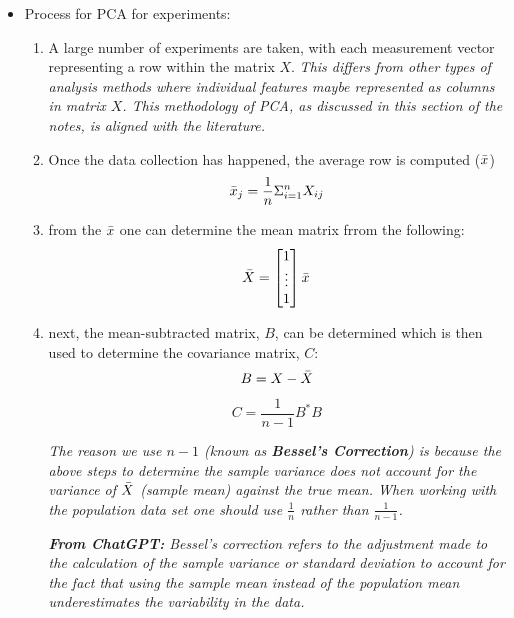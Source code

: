 \documentclass[11.5pt,a4paper]{article}
\begin{document}
\begin{itemize}
    \item Process for PCA for experiments:
    \begin{enumerate}
        \item A large number of experiments are taken, with each measurement vector representing a row within the matrix $X$. \textit{This differs from other types of analysis methods where individual features maybe represented as columns in matrix $X$. This methodology of PCA, as discussed in this section of the notes, is aligned with the literature.}
        \item Once the data collection has happened, the average row is computed ($\Bar{x}$)
        \begin{equation*}
            \Bar{x}_j = \frac{1}{n}\Sigma_{i=1}^n X_{ij}
        \end{equation*}
        \item from the $\Bar{x}$ one can determine the mean matrix frrom the following:
        \begin{equation*}
            \Bar{X} = \begin{bmatrix}
                1 \\
                \vdots \\
                1
            \end{bmatrix} \Bar{x}
        \end{equation*}
        \item next, the mean-subtracted matrix, $B$, can be determined which is then used to determine the covariance matrix, $C$:
        \begin{equation*}
            B = X - \Bar{X}
        \end{equation*}
        \begin{equation*}
            C = \frac{1}{n-1}B^*B
        \end{equation*}

        \textit{The reason we use $n-1$ (known as \textbf{Bessel's Correction}) is because the above steps to determine the sample variance does not account for the variance of $\Bar{X}$ (sample mean) against the true mean. When working with the population data set one should use $\frac{1}{n}$ rather than $\frac{1}{n-1}$.}

        \textit{\textbf{From ChatGPT:} Bessel's correction refers to the adjustment made to the calculation of the sample variance or standard deviation to account for the fact that using the sample mean instead of the population mean underestimates the variability in the data.}\newline


\end{enumerate}
\end{itemize}
\end{document}
